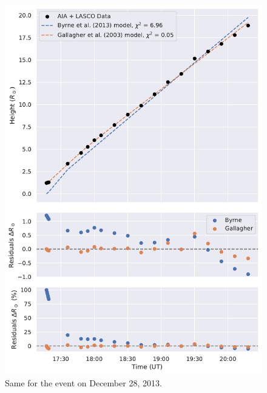 \begin{figure}[!htp]
	\centering
	\includegraphics[width=0.8\hsize]{chapter2/figs/appendix/height_profile_residuals_aia_lasco_131228_01.pdf}
	\caption{Same for the event on December 28, 2013.}
\end{figure}

